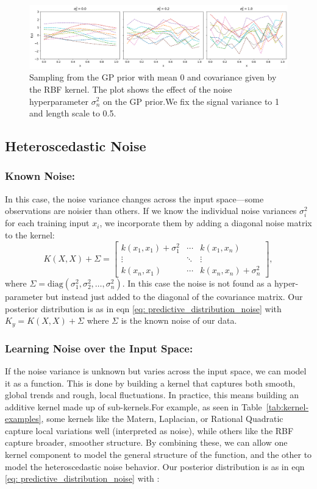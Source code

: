 \documentclass{ucdgradtaughtthesis}
\begin{document}
\begin{figure}[H]
    \centering
        \includegraphics[width=\textwidth]{LatexPlots/1dplots/Kernel_noise.png}
        \caption[Visualising the effect of noise on samples from the GP prior.]{Sampling from the GP prior with mean 0 and covariance given by the RBF kernel.
        The plot shows the effect of the noise hyperparameter \(\sigma_n^2\) on the GP prior.We fix the signal variance to 1 and length scale to 0.5.}
    \label{fig: kernel_noise}
\end{figure}



\subsection{Heteroscedastic Noise}  
\subsubsection{Known Noise:}
%
In this case, the noise variance changes across the input space—some observations are noisier than others. If we know the individual noise variances \( \sigma_i^2 \) for each training input \( x_i \), we incorporate them by adding a diagonal noise matrix to the kernel:
\[
K(X, X) + \Sigma = 
\begin{bmatrix}
k(x_1, x_1) + \sigma_1^2 & \cdots & k(x_1, x_n) \\
\vdots & \ddots & \vdots \\
k(x_n, x_1) & \cdots & k(x_n, x_n) + \sigma_n^2
\end{bmatrix},
\]
where \( \Sigma = \text{diag}(\sigma_1^2, \sigma_2^2, \dots, \sigma_n^2) \).
In this case the noise is not found as a hyper-parameter but instead just added to the diagonal of the covariance matrix.
Our posterior distribution is as in eqn \ref{eq:  predictive_distribution_noise} with \(K_y =K(X, X) + \Sigma \) where \(\Sigma\) is the known noise of our data. 
%
\subsubsection{Learning Noise over the Input Space:}
%
If the noise variance is unknown but varies across the input space, we can model it as a function. 
This is done by building a kernel that captures both smooth, global trends and rough, local fluctuations. 
In practice, this means building an additive kernel made up of sub-kernels.For example, as seen in Table~\ref{tab:kernel-examples}, some kernels like the Matern, Laplacian, or Rational Quadratic capture local variations well (interpreted as noise),
while others like the RBF capture broader, smoother structure. By combining these, we can allow one kernel component to model the general structure of the function, and the other to model the heteroscedastic noise behavior. 
Our posterior distribution is as in eqn \ref{eq:  predictive_distribution_noise} with :
\end{document}
